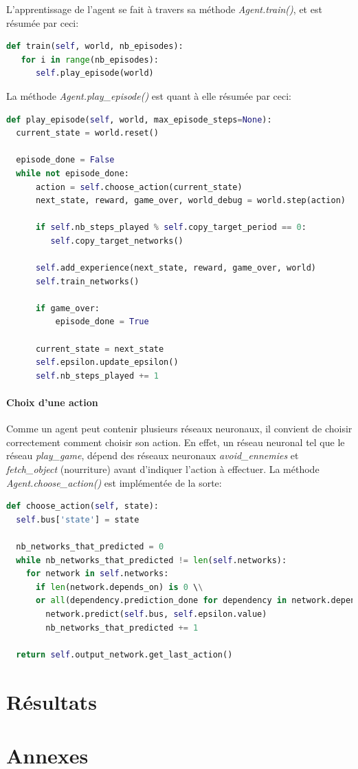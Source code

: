 \documentclass[11pt,a4paper]{report}
\begin{document}
  \par L'apprentissage de l'agent se fait à travers sa méthode \textit{Agent.train()}, et est résumée par ceci: 
  
  \begin{lstlisting}[language=python]
def train(self, world, nb_episodes):
   for i in range(nb_episodes):
      self.play_episode(world)
  \end{lstlisting} 
  
  \par La méthode \textit{Agent.play\_episode()} est quant à elle résumée par ceci: 
  
  \begin{lstlisting}[language=python]
def play_episode(self, world, max_episode_steps=None):
  current_state = world.reset()

  episode_done = False
  while not episode_done:
      action = self.choose_action(current_state)
      next_state, reward, game_over, world_debug = world.step(action)

      if self.nb_steps_played % self.copy_target_period == 0:
         self.copy_target_networks()

      self.add_experience(next_state, reward, game_over, world)
      self.train_networks()

      if game_over: 
          episode_done = True

      current_state = next_state
      self.epsilon.update_epsilon()
      self.nb_steps_played += 1

  \end{lstlisting} 
  
  \subsubsection{Choix d'une action}
  
  \par Comme un agent peut contenir plusieurs réseaux neuronaux, il convient de choisir correctement comment choisir son action. En effet, un réseau neuronal tel que le réseau \textit{play\_game}, dépend des réseaux neuronaux \textit{avoid\_ennemies} et \textit{fetch\_object} (nourriture) avant d'indiquer l'action à effectuer. La méthode \textit{Agent.choose\_action()} est implémentée de la sorte: 
  
  \begin{lstlisting}[language=python]
def choose_action(self, state):
  self.bus['state'] = state

  nb_networks_that_predicted = 0
  while nb_networks_that_predicted != len(self.networks):
    for network in self.networks:
      if len(network.depends_on) is 0 \\
      or all(dependency.prediction_done for dependency in network.depends_on):
        network.predict(self.bus, self.epsilon.value)
        nb_networks_that_predicted += 1

  return self.output_network.get_last_action()
  \end{lstlisting} 
  

  \chapter{Résultats}
  
  \chapter{Annexes}
       
\end{document}
